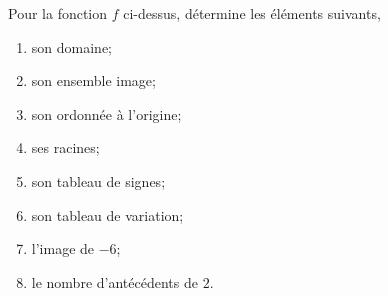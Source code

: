 %
%
    \begin{center}
        
    \end{center}
    Pour la fonction $f$ ci-dessus, détermine les éléments suivants,
    \begin{enumerate}[cols=2]
        \item son domaine;
        \item son ensemble image;
        \item son ordonnée à l'origine;
        \item ses racines;
        \item son tableau de signes;
        \item son tableau de variation;
        \item l'image de $-6$;
        \item le nombre d'antécédents de $2$.
    \end{enumerate}
